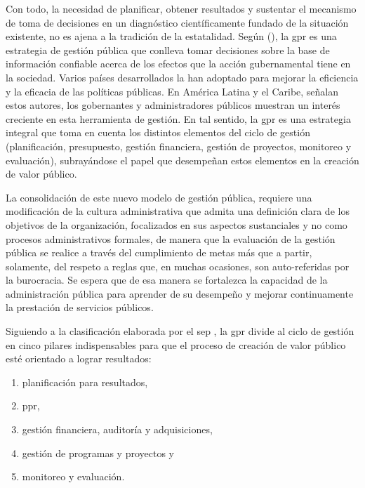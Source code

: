 Con todo, la necesidad de planificar, obtener resultados y sustentar el mecanismo de toma de decisiones en un diagnóstico científicamente fundado de la situación existente, no es ajena a la tradición de la estatalidad.
Según \citeauthor{garcialopez2010} (\citeyear{garcialopez2010}), la \ac{gpr} es una estrategia de gestión pública que conlleva tomar decisiones sobre la base de información confiable acerca de los efectos que la acción gubernamental tiene en la sociedad. Varios países desarrollados la han adoptado para mejorar la eficiencia y la eficacia de las políticas públicas. En América Latina y el Caribe, señalan estos autores, los gobernantes y administradores públicos muestran un interés creciente en esta herramienta de gestión. En tal sentido, la \ac{gpr} es una estrategia integral que toma en cuenta los distintos elementos del ciclo de gestión (planificación, presupuesto, gestión financiera, gestión de proyectos, monitoreo y evaluación), subrayándose el papel que desempeñan estos elementos en la creación de valor público.

La consolidación de este nuevo modelo de gestión pública, requiere una modificación de la cultura administrativa que admita una definición clara de los objetivos de la organización, focalizados en sus aspectos sustanciales y no como procesos administrativos formales, de manera que la evaluación de la gestión pública se realice a través del cumplimiento de metas más que a partir, solamente, del respeto a reglas que, en muchas ocasiones, son auto-referidas por la burocracia. Se espera que de esa manera se fortalezca la capacidad de la administración pública para aprender de su desempeño y mejorar continuamente la prestación de servicios públicos. 

Siguiendo a la clasificación elaborada por el \ac{sep} \parencite{sepprodev}, la \ac{gpr} divide al ciclo de gestión en cinco pilares indispensables para que el proceso de creación de valor público esté orientado a lograr resultados:

    \begin{enumerate}
        \item planificación para resultados, 
        \item \ac{ppr}, 
        \item gestión financiera, auditoría y adquisiciones, 
        \item gestión de programas y proyectos y 
        \item monitoreo y evaluación. 
    \end{enumerate}

